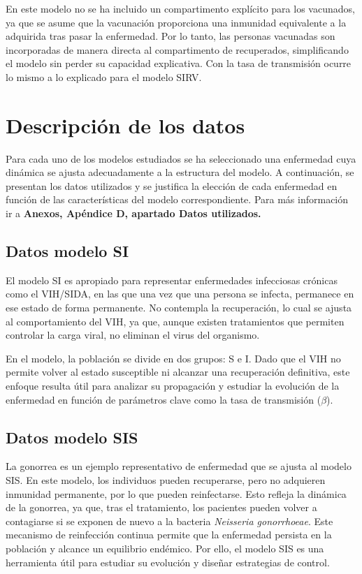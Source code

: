 En este modelo no se ha incluido un compartimento explícito para los vacunados, ya que se asume que la vacunación proporciona una inmunidad equivalente a la adquirida tras pasar la enfermedad. Por lo tanto, las personas vacunadas son incorporadas de manera directa al compartimento de recuperados, simplificando el modelo sin perder su capacidad explicativa. Con la tasa de transmisión ocurre lo mismo a lo explicado para el modelo SIRV.




\section{Descripción de los datos}
Para cada uno de los modelos estudiados se ha seleccionado una enfermedad cuya dinámica se ajusta adecuadamente a la estructura del modelo. A continuación, se presentan los datos utilizados y se justifica la elección de cada enfermedad en función de las características del modelo correspondiente. Para más información ir a \textbf{Anexos, Apéndice D, apartado Datos utilizados.}

\subsection{Datos modelo SI}
El modelo SI es apropiado para representar enfermedades infecciosas crónicas como el VIH/SIDA, en las que una vez que una persona se infecta, permanece en ese estado de forma permanente. No contempla la recuperación, lo cual se ajusta al comportamiento del VIH, ya que, aunque existen tratamientos que permiten controlar la carga viral, no eliminan el virus del organismo.

En el modelo, la población se divide en dos grupos: S e I. Dado que el VIH no permite volver al estado susceptible ni alcanzar una recuperación definitiva, este enfoque resulta útil para analizar su propagación y estudiar la evolución de la enfermedad en función de parámetros clave como la tasa de transmisión ($\beta$).

\subsection{Datos modelo SIS}
La gonorrea es un ejemplo representativo de enfermedad que se ajusta al modelo SIS. En este modelo, los individuos pueden recuperarse, pero no adquieren inmunidad permanente, por lo que pueden reinfectarse. Esto refleja la dinámica de la gonorrea, ya que, tras el tratamiento, los pacientes pueden volver a contagiarse si se exponen de nuevo a la bacteria \textit{Neisseria gonorrhoeae}.
Este mecanismo de reinfección continua permite que la enfermedad persista en la población y alcance un equilibrio endémico. Por ello, el modelo SIS es una herramienta útil para estudiar su evolución y diseñar estrategias de control. 



